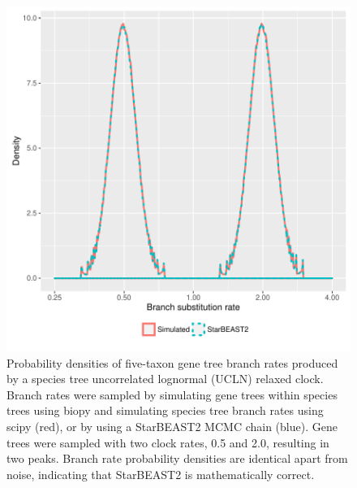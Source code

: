\documentclass[12pt]{article}
\begin{document}
\begin{figure}[htb!]
\centering
\includegraphics[width=16cm]{gene_branch_rates.pdf}
\caption
{Probability densities of five-taxon gene tree branch rates produced by a
species tree uncorrelated lognormal (UCLN) relaxed clock. Branch rates were
sampled by simulating gene trees within species trees using biopy and simulating
species tree branch rates using scipy (red), or by using a StarBEAST2 MCMC chain
(blue). Gene trees were sampled with two clock rates, 0.5 and 2.0, resulting in
two peaks. Branch rate probability densities are identical apart from noise,
indicating that StarBEAST2 is mathematically correct.}
\label{fig:geneBranchRates}
\end{figure}

\clearpage
\end{document}
